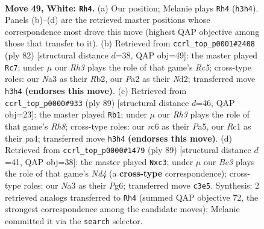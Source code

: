 \documentclass[11pt]{article}
\begin{document}
\clearpage

\begin{figure}[p]\centering
\begin{subfigure}{0.46\textwidth}\centering
\resizebox{\linewidth}{!}{%
\newchessgame
\chessboard[
  setfen={r7/p7/1pr1p1kp/n4p2/2P5/N1B1PP1R/P3K1P1/2R5 w - - 5 49},
  showmover=false,
  pgfstyle=straightmove, color=movearrow, markmove={h3-h4}
]}
\caption{}
\end{subfigure}\hfill
\begin{subfigure}{0.46\textwidth}\centering
\resizebox{\linewidth}{!}{%
\newchessgame
\chessboard[
  setfen={1r6/6p1/1r3pk1/2R1p2p/3n3P/1P4P1/1R1N1PK1/8 w - - 25 42},
  showmover=false,
  pgfstyle=straightmove, color=movearrow, markmove={c5-c7}
]}
\caption{}
\end{subfigure}
\\[4pt]
\begin{subfigure}{0.46\textwidth}\centering
\resizebox{\linewidth}{!}{%
\newchessgame
\chessboard[
  setfen={2r5/8/1p1p2pk/p2N1p2/P1nP4/2R1P3/R3KP2/7r b - - 5 45},
  showmover=false,
  pgfstyle=straightmove, color=movearrow, markmove={h1-b1}
]}
\caption{}
\end{subfigure}\hfill
\begin{subfigure}{0.46\textwidth}\centering
\resizebox{\linewidth}{!}{%
\newchessgame
\chessboard[
  setfen={5k2/1p3p2/1p4p1/2pn4/P6P/1PN2RP1/3r1P2/5K2 b - - 1 45},
  showmover=false,
  pgfstyle=straightmove, color=movearrow, markmove={d5-c3}
]}
\caption{}
\end{subfigure}
\caption{\textbf{Move 49, White: \texttt{Rh4}.} (a) Our position; Melanie plays \texttt{Rh4} (\texttt{h3h4}). Panels (b)--(d) are the retrieved master positions whose correspondence most drove this move (highest QAP objective among those that transfer to it). (b) Retrieved from \texttt{ccrl\_top\_p0001\#2408} (ply 82) [structural distance $d$=38, QAP obj=49]: the master played \texttt{Rc7}; under $\mu$ our \emph{Rh3} plays the role of that game's \emph{Rc5}; cross-type roles: our \emph{N}a3 as their \emph{R}b2, our \emph{P}a2 as their \emph{N}d2; transferred move \texttt{h3h4} \textbf{(endorses this move)}. (c) Retrieved from \texttt{ccrl\_top\_p0000\#933} (ply 89) [structural distance $d$=46, QAP obj=23]: the master played \texttt{Rb1}; under $\mu$ our \emph{Rh3} plays the role of that game's \emph{Rh8}; cross-type roles: our \emph{r}c6 as their \emph{P}a5, our \emph{R}c1 as their \emph{p}a4; transferred move \texttt{h3h4} \textbf{(endorses this move)}. (d) Retrieved from \texttt{ccrl\_top\_p0000\#1479} (ply 89) [structural distance $d$=41, QAP obj=38]: the master played \texttt{Nxc3}; under $\mu$ our \emph{Bc3} plays the role of that game's \emph{Nd4} (a \textbf{cross-type} correspondence); cross-type roles: our \emph{N}a3 as their \emph{P}g6; transferred move \texttt{c3e5}. Synthesis: 2 retrieved analogs transferred to \texttt{Rh4} (summed QAP objective 72, the strongest correspondence among the candidate moves); Melanie committed it via the \texttt{search} selector.}
\label{fig:thought-m96}
\end{figure}
\end{document}
